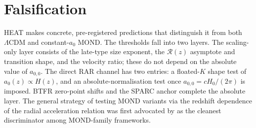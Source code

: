 \documentclass[twocolumn,letterpaper]{aastex631}
\newcommand{\azero}{a_0}
\newcommand{\lcdm}{\Lambda\mathrm{CDM}}
\newcommand{\azerolocal}{a_{0,0}}
\begin{document}
\section{Falsification}\label{sec:falsify}

HEAT makes concrete, pre-registered predictions that distinguish
it from both $\lcdm$ and constant-$\azero$ MOND.  The thresholds
fall into two layers.  The scaling-only layer consists of the
late-type size exponent, the $\mathcal{R}(z)$ asymptote and
transition shape, and the velocity ratio; these do not depend on
the absolute value of $\azerolocal$.  The direct RAR channel has
two entries: a floated-$K$ shape test of
$\azero(z)\propto H(z)$, and an absolute-normalisation test once
$\azerolocal=cH_0/(2\pi)$ is imposed.  BTFR zero-point shifts and
the SPARC anchor complete the absolute layer.  The general
strategy of testing MOND
variants via the redshift dependence of the radial acceleration
relation was first advocated by \citet{HossenfelderMistele2018}
as the cleanest discriminator among MOND-family frameworks.
\end{document}
